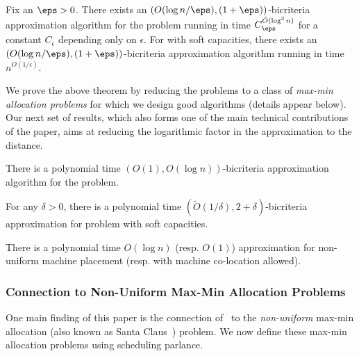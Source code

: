 \begin{theorem}\label{thm:1}
	Fix an $\eps > 0$. There exists an $(O(\log n/\eps), (1+\eps))$-bicriteria approximation algorithm for the \mckc problem running in time $C_\eps^{\tilde{O}(\log^3n)}$ for a constant $C_\epsilon$ depending only on $\epsilon$. For \mckc with soft capacities, there exists an $(O(\log n/\eps), (1+\eps))$-bicriteria approximation algorithm running in time $n^{O(1/\epsilon)}$.
\end{theorem}

We prove the above theorem by reducing the \mckc problems to a class of {\em max-min allocation problems} for which we design good algorithms (details appear below). Our next set of results, which also forms one of the main technical contributions of the paper, aims at reducing the logarithmic factor in the approximation to the distance. %
\begin{theorem}\label{thm:2}
	There is a polynomial time  $(O(1),O(\log n))$-bicriteria approximation algorithm for the \mckc problem.
\end{theorem}
\begin{theorem}\label{thm:2a}
	For any $\delta>0$, there is a polynomial time  $(\tilde{O}(1/\delta),2+\delta)$-bicriteria approximation for \mckc problem with soft capacities.
\end{theorem}
\begin{corollary}
There is a polynomial time $O(\log n)$ (resp. $O(1)$) approximation for non-uniform machine placement (resp. with machine co-location allowed).
\end{corollary}


\subsubsection{Connection to Non-Uniform Max-Min Allocation Problems}
One main finding of this paper is the connection of \mckc~to the {\em non-uniform} max-min allocation (also known as Santa Claus~\cite{BansalS06}) problem. %
We now define these max-min allocation problems using  scheduling parlance.

